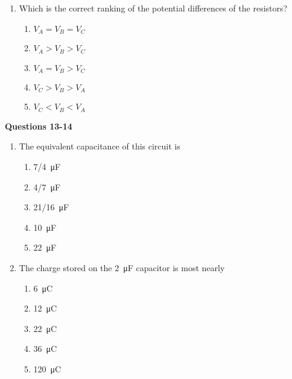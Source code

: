 \documentclass{../../../oss-apphys}
\begin{document}
\begin{multicols}{2}
\begin{enumerate}[leftmargin=18pt,resume]
  \item Which is the correct ranking of the potential differences of the
    resistors?
    \begin{enumerate}[noitemsep,topsep=0pt,leftmargin=18pt,label=(\Alph*)]
    \item $V_A = V_B = V_C$
    \item $V_A > V_B > V_C$
    \item $V_A = V_B > V_C$
    \item $V_C > V_B > V_A$
    \item $V_C < V_B < V_A$
    \end{enumerate}
  \end{enumerate}

  \columnbreak
  
  \textbf{Questions 13-14}

  \begin{center}
  \end{center}

  \begin{enumerate}[leftmargin=18pt,resume]
  \item The equivalent capacitance of this circuit is
    \begin{enumerate}[noitemsep,topsep=0pt,leftmargin=18pt,label=(\Alph*)]
    \item\SI{7/4}{\micro\farad}
    \item\SI{4/7}{\micro\farad}
    \item\SI{21/16}{\micro\farad}
    \item\SI{10}{\micro\farad}
    \item\SI{22}{\micro\farad}
    \end{enumerate}
    
  \item The charge stored on the \SI{2}{\micro\farad} capacitor is most nearly
    \begin{enumerate}[noitemsep,topsep=0pt,leftmargin=18pt,label=(\Alph*)]
    \item\SI{6}{\micro\coulomb}
    \item\SI{12}{\micro\coulomb}
    \item\SI{22}{\micro\coulomb}
    \item\SI{36}{\micro\coulomb}
    \item\SI{120}{\micro\coulomb}
    \end{enumerate}


\end{enumerate}
\end{multicols}
\end{document}
